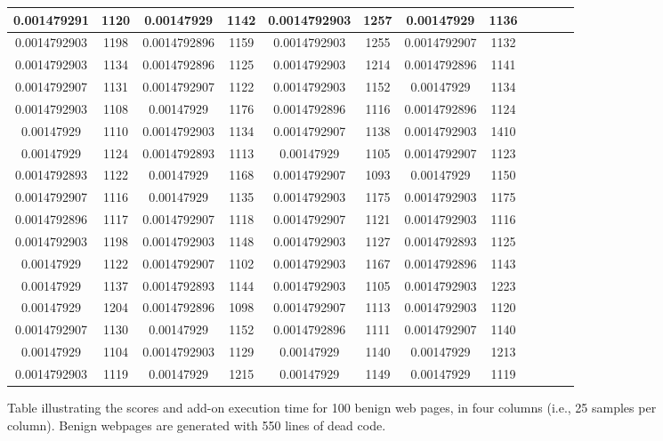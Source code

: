 \begin{figure}[h]
\begin{tabular}{|c|c|c|c|c|c|c|c|c|c|c|c|}
\midrule
0.001479291&1120&0.00147929&1142&0.0014792903&1257&0.00147929&1136\\
\midrule
0.0014792903&1198&0.0014792896&1159&0.0014792903&1255&0.0014792907&1132\\
\midrule
0.0014792903&1134&0.0014792896&1125&0.0014792903&1214&0.0014792896&1141\\
\midrule
0.0014792907&1131&0.0014792907&1122&0.0014792903&1152&0.00147929&1134\\
\midrule
0.0014792903&1108&0.00147929&1176&0.0014792896&1116&0.0014792896&1124\\
\midrule
0.00147929&1110&0.0014792903&1134&0.0014792907&1138&0.0014792903&1410\\
\midrule
0.00147929&1124&0.0014792893&1113&0.00147929&1105&0.0014792907&1123\\
\midrule
0.0014792893&1122&0.00147929&1168&0.0014792907&1093&0.00147929&1150\\
\midrule
0.0014792907&1116&0.00147929&1135&0.0014792903&1175&0.0014792903&1175\\
\midrule
0.0014792896&1117&0.0014792907&1118&0.0014792907&1121&0.0014792903&1116\\
\midrule
0.0014792903&1198&0.0014792903&1148&0.0014792903&1127&0.0014792893&1125\\
\midrule
0.00147929&1122&0.0014792907&1102&0.0014792903&1167&0.0014792896&1143\\
\midrule
0.00147929&1137&0.0014792893&1144&0.0014792903&1105&0.0014792903&1223\\
\midrule
0.00147929&1204&0.0014792896&1098&0.0014792907&1113&0.0014792903&1120\\
\midrule
0.0014792907&1130&0.00147929&1152&0.0014792896&1111&0.0014792907&1140\\
\midrule
0.00147929&1104&0.0014792903&1129&0.00147929&1140&0.00147929&1213\\
\midrule
0.0014792903&1119&0.00147929&1215&0.00147929&1149&0.00147929&1119\\
\midrule
\end{tabular}
    \caption[Scores table of benign web pages]{Table illustrating the scores and add-on execution time for 100 benign web pages, in four columns (i.e., 25 samples per column). Benign webpages are generated with 550 lines of dead code.}
    \label{fig:b500table}
\end{figure}
